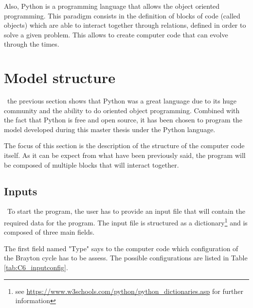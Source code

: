 Also, Python is a programming language that allows the object oriented programming. This paradigm consists in the definition of blocks of code (called objects) which are able to interact together through relations, defined in order to solve a given problem. This allows to create computer code that can evolve through the times. 

\section{Model structure}
\quad\, the previous section shows that Python was a great language due to its huge community and the ability to do oriented object programming. Combined with the fact that Python is free and open source, it has been chosen to program the model developed during this master thesis under the Python language.

The focus of this section is the description of the structure of the computer code itself. As it can be expect from what have been previously said, the program will be composed of multiple blocks that will interact together.

\subsection{Inputs}
\quad\, To start the program, the user has to provide an input file that will contain the required data for the program. The input file is structured as a dictionary\footnote{see \url{https://www.w3schools.com/python/python_dictionaries.asp} for further information} and is composed of three main fields. 

The first field named "Type" says to the computer code which configuration of the Brayton cycle has to be assess. The possible configurations are listed in Table \ref{tab:C6_inputconfig}.

